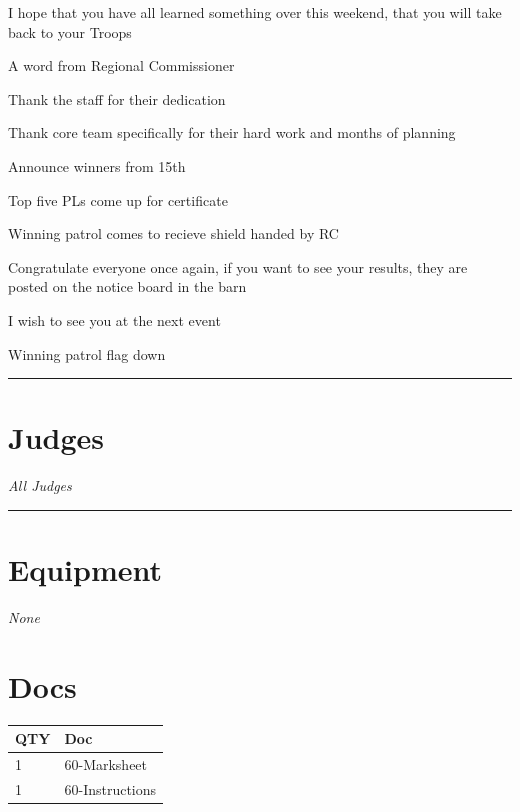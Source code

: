 \documentclass[10pt]{article}
\begin{document}
I hope that you have all learned something over this weekend, that you will take back to your Troops

A word from Regional Commissioner

Thank the staff for their dedication 

Thank core team specifically for their hard work and months of planning

Announce winners from 15th

Top five PLs come up for certificate

Winning patrol comes to recieve shield handed by RC

Congratulate everyone once again, if you want to see your results, they are posted on the notice board in the barn

I wish to see you at the next event

Winning patrol flag down


\vspace{0.5cm}
	\hrule
	\vspace{0.5cm}
		\section*{\faUsers \: Judges}

					\textit{All Judges}
			\vspace{0.5cm}
	\hrule
	\vspace{0.5cm}

	\begin{multicols}{2}

		\section*{\faWrench \: Equipment}

				\textit{None}
		
		\vfill\null
		\columnbreak

			\section*{\faFile \: Docs}
		 	\begin{center}
			\begin{tabular}{p{2cm}p{4cm}}

			\textbf{QTY} & \textbf{Doc} \\\toprule
										1&60-Marksheet\\\midrule
										1&60-Instructions\\\midrule
							\end{tabular}
			\end{center}
	

		\vfill\null

		\end{multicols}
\end{document}
